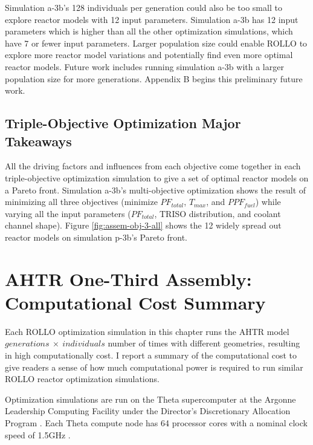 Simulation a-3b's 128 individuals per generation could also be too small to explore 
reactor models with 12 input parameters. 
Simulation a-3b has 12 input parameters which is higher than all the other 
optimization simulations, which have 7 or fewer input parameters. 
Larger population size could enable \gls{ROLLO} to explore more reactor model 
variations and potentially find even more optimal reactor models. 
Future work includes running simulation a-3b with a larger population size for more 
generations. 
Appendix B begins this preliminary future work. 

\subsection{Triple-Objective Optimization Major Takeaways}
All the driving factors and influences from each objective come together in 
each triple-objective optimization simulation to give a set of optimal reactor models 
on a Pareto front. 
Simulation a-3b's multi-objective optimization shows the result of minimizing all 
three objectives (minimize $PF_{total}$, $T_{max}$, and $PPF_{fuel}$) while varying 
all the input parameters ($PF_{total}$, TRISO distribution, and coolant channel shape).
Figure \ref{fig:assem-obj-3-all} shows the 12 widely spread out reactor models on 
simulation p-3b's Pareto front. 

\section{AHTR One-Third Assembly: Computational Cost Summary}
\label{sec:assem-compute-cost}
Each \gls{ROLLO} optimization simulation in this chapter runs the \gls{AHTR} model 
$generations \ \times \ individuals$ number of times with different geometries, 
resulting in high computationally cost. 
I report a summary of the computational cost to give readers a sense of how much 
computational power is required to run similar \gls{ROLLO} reactor optimization 
simulations. 

Optimization simulations are run on the Theta supercomputer at the Argonne Leadership 
Computing Facility under the Director's Discretionary Allocation Program 
\cite{noauthor_thetathetagpu_2022}. 
Each Theta compute node has 64 processor cores with a nominal clock speed of 
1.5GHz \cite{noauthor_thetathetagpu_2022}.  

